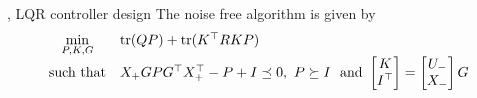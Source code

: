 \begin{lemma}{\rm \cite{Persis2020,Dorfler2022On}, LQR controller design}
The noise free algorithm is given by
\begin{equation}\label{eq:prob_ori}
\begin{array}{cl}
 \displaystyle{\min_{P,K,G}} & \trace(QP)+\trace(K^\top RKP)\\
 {\text{such that}} & X_+GPG^\top X_+^\top -P+I\preceq 0,\  P \succeq I\ {\text{ and }} \bbm K\\ I^\top\ebm=\bbm U_-\\X_-\ebm G\\
\end{array}
\end{equation}
\end{lemma}
